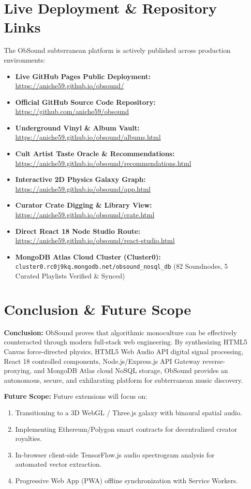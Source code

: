 \documentclass[12pt,a4paper,oneside]{report}
\begin{document}
\section{Live Deployment \& Repository Links}
The ObSound subterranean platform is actively published across production environments:
\begin{itemize}
    \item \textbf{Live GitHub Pages Public Deployment:} \url{https://aniche59.github.io/obsound/}
    \item \textbf{Official GitHub Source Code Repository:} \url{https://github.com/aniche59/obsound}
    \item \textbf{Underground Vinyl \& Album Vault:} \url{https://aniche59.github.io/obsound/albums.html}
    \item \textbf{Cult Artist Taste Oracle \& Recommendations:} \url{https://aniche59.github.io/obsound/recommendations.html}
    \item \textbf{Interactive 2D Physics Galaxy Graph:} \url{https://aniche59.github.io/obsound/app.html}
    \item \textbf{Curator Crate Digging \& Library View:} \url{https://aniche59.github.io/obsound/crate.html}
    \item \textbf{Direct React 18 Node Studio Route:} \url{https://aniche59.github.io/obsound/react-studio.html}
    \item \textbf{MongoDB Atlas Cloud Cluster (Cluster0):} \texttt{cluster0.rc0j9kq.mongodb.net/obsound\_nosql\_db} (82 Soundnodes, 5 Curated Playlists Verified \& Synced)
\end{itemize}

\section{Conclusion \& Future Scope}
\textbf{Conclusion:} ObSound proves that algorithmic monoculture can be effectively counteracted through modern full-stack web engineering. By synthesizing HTML5 Canvas force-directed physics, HTML5 Web Audio API digital signal processing, React 18 controlled components, Node.js/Express.js API Gateway reverse-proxying, and MongoDB Atlas cloud NoSQL storage, ObSound provides an autonomous, secure, and exhilarating platform for subterranean music discovery.

\noindent \textbf{Future Scope:} Future extensions will focus on:
\begin{enumerate}
    \item Transitioning to a 3D WebGL / Three.js galaxy with binaural spatial audio.
    \item Implementing Ethereum/Polygon smart contracts for decentralized creator royalties.
    \item In-browser client-side TensorFlow.js audio spectrogram analysis for automated vector extraction.
    \item Progressive Web App (PWA) offline synchronization with Service Workers.
\end{enumerate}
\end{document}
